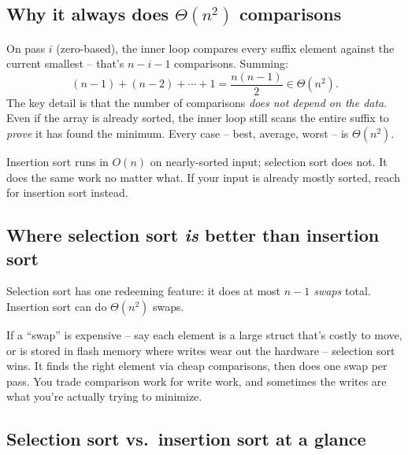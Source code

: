 \documentclass[11pt]{article}
\begin{document}
\subsection{Why it always does $\Theta(n^2)$ comparisons}

\begin{ideabox}
On pass $i$ (zero-based), the inner loop compares every suffix
element against the current smallest -- that's $n - i - 1$
comparisons. Summing:
\[
  (n - 1) + (n - 2) + \cdots + 1 = \frac{n(n - 1)}{2} \in \Theta(n^2).
\]
The key detail is that the number of comparisons \emph{does not
depend on the data}. Even if the array is already sorted, the inner
loop still scans the entire suffix to \emph{prove} it has found the
minimum. Every case -- best, average, worst -- is $\Theta(n^2)$.
\end{ideabox}

\begin{warnbox}
Insertion sort runs in $O(n)$ on nearly-sorted input; selection sort
does not. It does the same work no matter what. If your input is
already mostly sorted, reach for insertion sort instead.
\end{warnbox}

\subsection{Where selection sort \emph{is} better than insertion sort}

Selection sort has one redeeming feature: it does at most
\emph{$n - 1$ swaps} total. Insertion sort can do $\Theta(n^2)$
swaps.

\begin{ideabox}
If a ``swap'' is expensive -- say each element is a large struct
that's costly to move, or is stored in flash memory where writes
wear out the hardware -- selection sort wins. It finds the right
element via cheap comparisons, then does one swap per pass. You
trade comparison work for write work, and sometimes the writes are
what you're actually trying to minimize.
\end{ideabox}

\subsection*{Selection sort vs.\ insertion sort at a glance}
\end{document}
